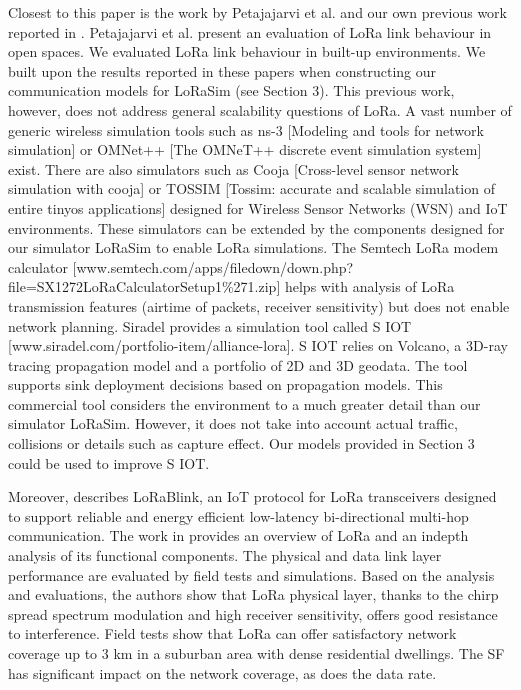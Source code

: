 Closest to this paper is the work by Petajajarvi et al.
\cite{petajajarvi_coverage_2015} and our own previous work reported in \cite{bor_lora_nodate}.
Petajajarvi et al.
present an evaluation of LoRa link behaviour in open spaces.
We evaluated LoRa link behaviour in built-up environments.
We built upon the results reported in these papers when constructing our communication models for LoRaSim (see Section 3).
This previous work,
	however,
	does not address general scalability questions of LoRa.
A vast number of generic wireless simulation tools such as ns-3 [Modeling and tools for network simulation] or OMNet++ [The OMNeT++ discrete event simulation system] exist.
There are also simulators such as Cooja [Cross-level sensor network simulation with cooja] or TOSSIM [Tossim:
	accurate and scalable simulation of entire tinyos applications] designed for Wireless Sensor Networks (WSN) and IoT environments.
These simulators can be extended by the components designed for our simulator LoRaSim to enable LoRa simulations.
The Semtech LoRa modem calculator [www.semtech.com/apps/ﬁledown/down.php? ﬁle=SX1272LoRaCalculatorSetup1\%271.zip] helps with analysis of LoRa transmission features (airtime of packets,
receiver sensitivity) but does not enable network planning.
Siradel provides a simulation tool called S IOT [www.siradel.com/portfolio-item/alliance-lora].
S IOT relies on Volcano,
	a 3D-ray tracing propagation model and a portfolio of 2D and 3D geodata.
The tool supports sink deployment decisions based on propagation models.
This commercial tool considers the environment to a much greater detail than our simulator LoRaSim.
However,
	it does not take into account actual traffic,
	collisions or details such as capture effect.
Our models provided in Section 3 could be used to improve S IOT.

Moreover,
	\cite{bor_lora_nodate} describes LoRaBlink,
	an IoT protocol for LoRa transceivers designed to support reliable and energy efficient low-latency bi-directional multi-hop communication.
The work in \cite{augustin_study_2016} provides an overview of LoRa and an indepth analysis of its functional components.
The physical and data link layer performance are evaluated by field tests and simulations.
Based on the analysis and evaluations,
	the authors show that LoRa physical layer,
	thanks to the chirp spread spectrum modulation and high receiver sensitivity,
	offers good resistance to interference.
Field tests show that LoRa can offer satisfactory network coverage up to 3 km in a suburban area with dense residential dwellings.
The SF has significant impact on the network coverage,
	as does the data rate.




